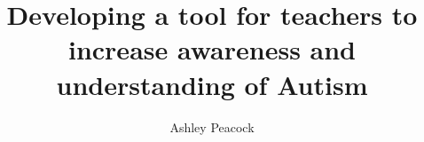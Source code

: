 \documentclass[11pt]{report}
\begin{document}
\title{Developing a tool for teachers to increase awareness and understanding of Autism}
\author{Ashley Peacock}
\maketitle

\tableofcontents















{}

\end{document}
